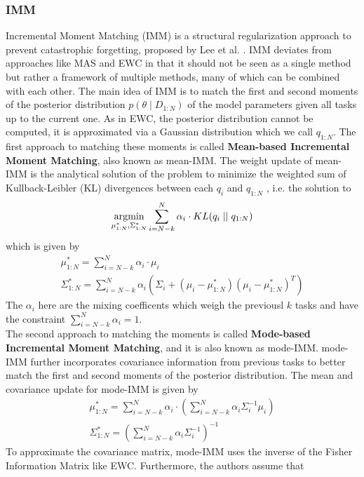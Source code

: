 \subsubsection{IMM}
Incremental Moment Matching (IMM) is a structural regularization approach to prevent catastrophic forgetting, proposed by Lee et al. \cite{lee2017overcoming}.
IMM deviates from approaches like MAS and EWC in that it should not be seen as a single method but rather a framework of multiple methods, many of which can be
combined with each other. The main idea of IMM is to match the first and second moments of the posterior distribution $p(\theta \mid D_{1:N})$ of the model 
parameters given all tasks up to the current one. As in EWC, the posterior distribution cannot be computed, it is approximated via a Gaussian distribution which
we call $q_{1:N}$. The first approach to matching these moments is called \textbf{Mean-based Incremental Moment Matching}, also known as mean-IMM. The weight
update of mean-IMM is the analytical solution of the problem to minimize the weighted sum of Kullback-Leibler (KL) divergences between each $q_i$ and $q_{1:N}$
\cite{goldberger2004hierarchical}, i.e. the solution to
\begin{equation}
    \operatorname*{\arg\!\min}_{\mu^*_{1:N},\Sigma^*_{1:N}} \sum_{i=N-k}^N \alpha_i \cdot KL(q_i \mid \mid q_{1:N})
\end{equation}
which is given by
\begin{gather}
    \mu^*_{1:N} = \sum_{i=N-k}^N \alpha_i \cdot \mu_i \\
    \Sigma^*_{1:N} = \sum_{i=N-k}^N \alpha_i (\Sigma_i + (\mu_i - \mu^*_{1:N})(\mu_i - \mu^*_{1:N})^T)
\end{gather}
The $\alpha_i$ here are the mixing coefficents which weigh the previousl $k$ tasks and have the constraint $\sum_{i=N-k}^N \alpha_i = 1$.  \\
The second approach to matching the moments is called \textbf{Mode-based Incremental Moment Matching}, and it is also known as mode-IMM. mode-IMM
further incorporates covariance information from previous tasks to better match the first and second moments of the posterior distribution. 
The mean and covariance update for mode-IMM is given by
\begin{gather}
    \mu^*_{1:N} = \sum_{i=N-k}^N \alpha_i \cdot (\sum_{i=N-k}^N \alpha_i \Sigma_i^{-1} \mu_i) \\
    \Sigma^*_{1:N} = (\sum_{i=N-k}^N \alpha_i  \Sigma_i^{-1})^{-1}
\end{gather}
To approximate the covariance matrix, mode-IMM uses the inverse of the Fisher Information Matrix like EWC. Furthermore, the authors assume that
